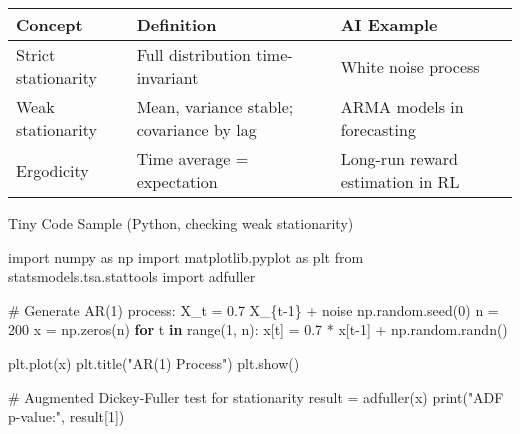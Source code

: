 \documentclass[
  letterpaper,
  DIV=11,
  numbers=noendperiod]{scrreprt}
\newenvironment{Shaded}{\begin{snugshade}}{\end{snugshade}}
\newcommand{\BuiltInTok}[1]{\textcolor[rgb]{0.00,0.23,0.31}{#1}}
\newcommand{\CommentTok}[1]{\textcolor[rgb]{0.37,0.37,0.37}{#1}}
\newcommand{\ControlFlowTok}[1]{\textcolor[rgb]{0.00,0.23,0.31}{\textbf{#1}}}
\newcommand{\DecValTok}[1]{\textcolor[rgb]{0.68,0.00,0.00}{#1}}
\newcommand{\FloatTok}[1]{\textcolor[rgb]{0.68,0.00,0.00}{#1}}
\newcommand{\ImportTok}[1]{\textcolor[rgb]{0.00,0.46,0.62}{#1}}
\newcommand{\KeywordTok}[1]{\textcolor[rgb]{0.00,0.23,0.31}{\textbf{#1}}}
\newcommand{\NormalTok}[1]{\textcolor[rgb]{0.00,0.23,0.31}{#1}}
\newcommand{\OperatorTok}[1]{\textcolor[rgb]{0.37,0.37,0.37}{#1}}
\newcommand{\StringTok}[1]{\textcolor[rgb]{0.13,0.47,0.30}{#1}}
\begin{document}
\begin{longtable}[]{@{}
  >{\raggedright\arraybackslash}p{}
  >{\raggedright\arraybackslash}p{}
  >{\raggedright\arraybackslash}p{}@{}}
\toprule\noalign{}
\begin{minipage}[b]{\linewidth}\raggedright
Concept
\end{minipage} & \begin{minipage}[b]{\linewidth}\raggedright
Definition
\end{minipage} & \begin{minipage}[b]{\linewidth}\raggedright
AI Example
\end{minipage} \\
\midrule\noalign{}
\endhead
\bottomrule\noalign{}
\endlastfoot
Strict stationarity & Full distribution time-invariant & White noise
process \\
Weak stationarity & Mean, variance stable; covariance by lag & ARMA
models in forecasting \\
Ergodicity & Time average = expectation & Long-run reward estimation in
RL \\
\end{longtable}

Tiny Code Sample (Python, checking weak stationarity)

\begin{Shaded}
\begin{Highlighting}[]
\ImportTok{import}\NormalTok{ numpy }\ImportTok{as}\NormalTok{ np}
\ImportTok{import}\NormalTok{ matplotlib.pyplot }\ImportTok{as}\NormalTok{ plt}
\ImportTok{from}\NormalTok{ statsmodels.tsa.stattools }\ImportTok{import}\NormalTok{ adfuller}

\CommentTok{\# Generate AR(1) process: X\_t = 0.7 X\_\{t{-}1\} + noise}
\NormalTok{np.random.seed(}\DecValTok{0}\NormalTok{)}
\NormalTok{n }\OperatorTok{=} \DecValTok{200}
\NormalTok{x }\OperatorTok{=}\NormalTok{ np.zeros(n)}
\ControlFlowTok{for}\NormalTok{ t }\KeywordTok{in} \BuiltInTok{range}\NormalTok{(}\DecValTok{1}\NormalTok{, n):}
\NormalTok{    x[t] }\OperatorTok{=} \FloatTok{0.7} \OperatorTok{*}\NormalTok{ x[t}\OperatorTok{{-}}\DecValTok{1}\NormalTok{] }\OperatorTok{+}\NormalTok{ np.random.randn()}

\NormalTok{plt.plot(x)}
\NormalTok{plt.title(}\StringTok{"AR(1) Process"}\NormalTok{)}
\NormalTok{plt.show()}

\CommentTok{\# Augmented Dickey{-}Fuller test for stationarity}
\NormalTok{result }\OperatorTok{=}\NormalTok{ adfuller(x)}
\BuiltInTok{print}\NormalTok{(}\StringTok{"ADF p{-}value:"}\NormalTok{, result[}\DecValTok{1}\NormalTok{])}
\end{Highlighting}
\end{Shaded}
\end{document}
